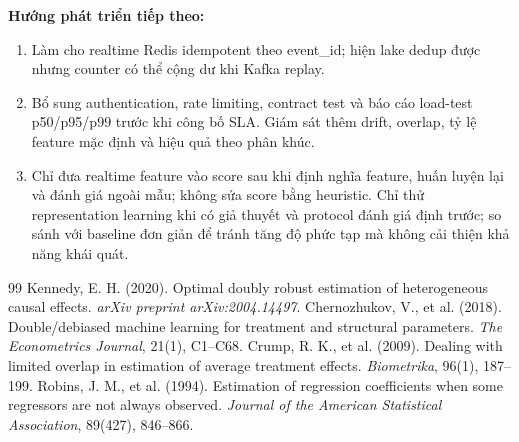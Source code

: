 \documentclass[11pt,a4paper]{article}
\DeclareRobustCommand{\code}[1]{{\small\texttt{#1}}}
\def\code#1{#1}%
\begin{document}
\textbf{Hướng phát triển tiếp theo:}
\begin{enumerate}
    \item Làm cho realtime Redis idempotent theo \code{event\_id}; hiện lake
    dedup được nhưng counter có thể cộng dư khi Kafka replay.
    \item Bổ sung authentication, rate limiting, contract test và báo cáo
    load-test p50/p95/p99 trước khi công bố SLA. Giám sát thêm drift, overlap,
    tỷ lệ feature mặc định và hiệu quả theo phân khúc.
    \item Chỉ đưa realtime feature vào score sau khi định nghĩa feature,
    huấn luyện lại và đánh giá ngoài mẫu; không sửa score bằng heuristic.
    Chỉ thử representation learning khi có giả thuyết và protocol đánh
    giá định trước; so sánh với baseline đơn giản để tránh tăng độ phức tạp
    mà không cải thiện khả năng khái quát.
\end{enumerate}

\begin{thebibliography}{99}
 Kennedy, E. H. (2020). Optimal doubly robust estimation of heterogeneous causal effects. \textit{arXiv preprint arXiv:2004.14497}.
 Chernozhukov, V., et al. (2018). Double/debiased machine learning for treatment and structural parameters. \textit{The Econometrics Journal}, 21(1), C1--C68.
 Crump, R. K., et al. (2009). Dealing with limited overlap in estimation of average treatment effects. \textit{Biometrika}, 96(1), 187--199.
 Robins, J. M., et al. (1994). Estimation of regression coefficients when some regressors are not always observed. \textit{Journal of the American Statistical Association}, 89(427), 846--866.
\end{thebibliography}
\end{document}
